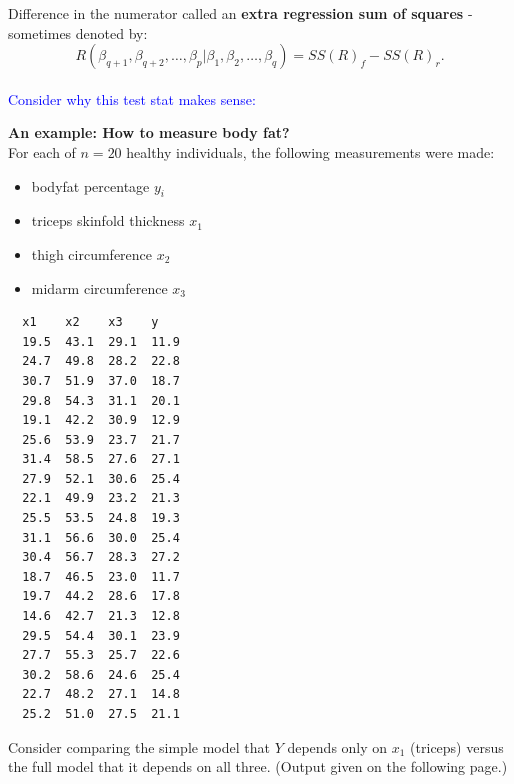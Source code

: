 Difference in the numerator called an \textbf{extra regression sum of squares} - sometimes denoted by:
$$ R(\beta_{q+1},\beta_{q+2},\ldots,\beta_p|\beta_{1},\beta_{2},\ldots,\beta_q) = SS(R)_f-SS(R)_r.$$~\\

\textcolor{blue}{Consider why this test stat makes sense:}

\newpage

\textbf{An example: How to measure body fat?} \\
For each of $n=20$ healthy individuals, the following measurements were made:
\begin{itemize}
\item bodyfat percentage $y_i$
\item triceps skinfold thickness $x_{1}$
\item thigh circumference $x_{2}$
\item midarm circumference $x_{3}$
\end{itemize}

\begin{small}
\begin{verbatim}
  x1    x2    x3    y
  19.5  43.1  29.1  11.9
  24.7  49.8  28.2  22.8                   
  30.7  51.9  37.0  18.7                   
  29.8  54.3  31.1  20.1                   
  19.1  42.2  30.9  12.9                   
  25.6  53.9  23.7  21.7
  31.4  58.5  27.6  27.1
  27.9  52.1  30.6  25.4
  22.1  49.9  23.2  21.3
  25.5  53.5  24.8  19.3
  31.1  56.6  30.0  25.4
  30.4  56.7  28.3  27.2
  18.7  46.5  23.0  11.7
  19.7  44.2  28.6  17.8
  14.6  42.7  21.3  12.8
  29.5  54.4  30.1  23.9
  27.7  55.3  25.7  22.6
  30.2  58.6  24.6  25.4
  22.7  48.2  27.1  14.8
  25.2  51.0  27.5  21.1
\end{verbatim}
\end{small}

Consider comparing the simple model that $Y$ depends only on $x_1$ (triceps) versus the full model that it depends on all three.  (Output given on the following page.)\\

